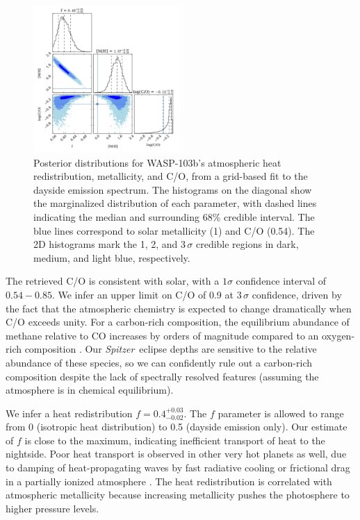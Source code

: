 \documentclass[twocolumn]{aastex61}
\newcommand{\project}[1]{\textsl{#1}}
\newcommand{\Spitzer}{\project{Spitzer}}
\begin{document}
\begin{figure}
\includegraphics[width = 0.5\textwidth]{Figures/WASP-103b_grid_DAYSIDE_stair_pairs_02.pdf}
\caption{Posterior distributions for WASP-103b's atmospheric heat redistribution, metallicity, and C/O, from a grid-based fit to the dayside emission spectrum. The histograms on the diagonal show the marginalized distribution of each parameter, with dashed lines indicating the median and surrounding 68\% credible interval. The blue lines correspond to solar metallicity (1) and C/O (0.54). The 2D histograms mark the 1, 2, and 3$\,\sigma$ credible regions in dark, medium, and light blue, respectively.}
\label{fig:composition}
\end{figure}

The retrieved C/O is consistent with solar, with a $1\sigma$ confidence interval of $0.54 - 0.85$. We infer an upper limit on C/O of 0.9 at $3\,\sigma$ confidence, driven by the fact that the atmospheric chemistry is expected to change dramatically when C/O exceeds unity. For a carbon-rich composition, the equilibrium abundance of methane relative to CO increases by orders of magnitude compared to an oxygen-rich  composition \citep[e.g.][]{madhusudhan11}. Our \Spitzer\ eclipse depths are sensitive to the relative abundance of these species, so we can confidently rule out a carbon-rich composition despite the lack of spectrally resolved features (assuming the atmosphere is in chemical equilibrium).

We infer a heat redistribution $f = 0.4^{+0.03}_{-0.02}$. The $f$ parameter is allowed to range from 0 (isotropic heat distribution) to 0.5 (dayside emission only). Our estimate of $f$ is close to the maximum, indicating inefficient transport of heat to the nightside. Poor heat transport is observed in other very hot planets as well, due to damping of heat-propagating waves by fast radiative cooling or frictional drag in a partially ionized atmosphere \citep{komacek17}. The heat redistribution is correlated with atmospheric metallicity because increasing metallicity pushes the photosphere to higher pressure levels. 
\end{document}
